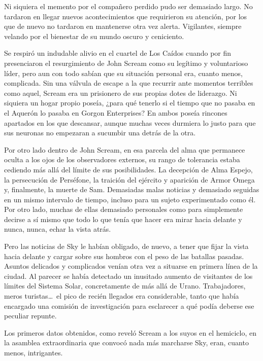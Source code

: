 Ni siquiera el memento por el compañero perdido pudo ser demasiado largo. No tardaron en llegar nuevos acontecimientos que requirieron su atención, por los que de nuevo no tardaron en mantenerse otra vez alerta. Vigilantes, siempre velando por el bienestar de su mundo oscuro y ceniciento.

\fancyparbreak
Se respiró un indudable alivio en el cuartel de Los Caídos cuando por fin presenciaron el resurgimiento de John Scream como su legítimo y voluntarioso líder, pero aun con todo sabían que su situación personal era, cuanto menos, complicada. Sin una válvula de escape a la que recurrir ante momentos terribles como aquel, Scream era un prisionero de sus propias dotes de liderazgo. Ni siquiera un hogar propio poseía, ¿para qué tenerlo si el tiempo que no pasaba en el Aquerón lo pasaba en Gorgon Enterprises? En ambos poseía rincones apartados en los que descansar, aunque muchas veces durmiera lo justo para que sus neuronas no empezaran a sucumbir una detrás de la otra.

Por otro lado dentro de John Scream, en esa parcela del alma que permanece oculta a los ojos de los observadores externos, su rango de tolerancia estaba cediendo más allá del límite de sus posibilidades. La decepción de Alma Espejo, la persecución de Perséfone, la traición del ejército y aparición de Armor Omega y, finalmente, la muerte de Sam. Demasiadas malas noticias y demasiado seguidas en un mismo intervalo de tiempo, incluso para un sujeto experimentado como él. Por otro lado, muchas de ellas demasiado personales como para simplemente decirse a sí mismo que todo lo que tenía que hacer era mirar hacia delante y nunca, nunca, echar la vista atrás.

Pero las noticias de Sky le habían obligado, de nuevo, a tener que fijar la vista hacia delante y cargar sobre sus hombros con el peso de las batallas pasadas. Asuntos delicados y complicados venían otra vez a situarse en primera línea de la ciudad. Al parecer se había detectado un inusitado aumento de visitantes de los límites del Sistema Solar, concretamente de más allá de Urano. Trabajadores, meros turistas\dots\ el pico de recién llegados era considerable, tanto que había encargado una comisión de investigación para esclarecer a qué podía deberse ese peculiar repunte.

Los primeros datos obtenidos, como reveló Scream a los suyos en el hemiciclo, en la asamblea extraordinaria que convocó nada más marcharse Sky, eran, cuanto menos, intrigantes.

